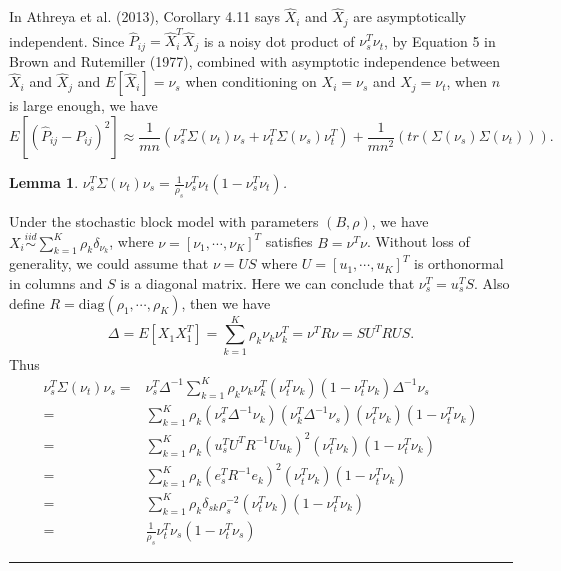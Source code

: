 \documentclass[a4paper]{article}
\newenvironment{proof}{{\bf Proof:  }}{\hfill\rule{2mm}{2mm}}
\newtheorem{lemma}[fact]{Lemma}
\begin{document}
In Athreya et al. (2013), Corollary 4.11 says $\hat{X}_i$ and $\hat{X}_j$ are asymptotically independent. Since $\hat{P}_{ij} = \hat{X}_i^T \hat{X}_j$ is a noisy dot product of $\nu_s^T \nu_t$, by Equation 5 in Brown and Rutemiller (1977), combined with asymptotic independence between $\hat{X}_i$ and $\hat{X}_j$ and $E[\hat{X}_i] = \nu_s$ when conditioning on $X_i = \nu_s$ and $X_j = \nu_t$, when $n$ is large enough, we have
\begin{equation}
\label{eqn:1}
	E[(\hat{P}_{ij} - P_{ij})^2] \approx
    \frac{1}{m n} \left( \nu_s^T \Sigma(\nu_t) \nu_s + \nu_t^T \Sigma(\nu_s) \nu_t^T \right)
    + \frac{1}{m n^2} \left( tr(\Sigma(\nu_s) \Sigma(\nu_t)) \right).
\end{equation}


\begin{lemma}
\label{lemma:1}
$\nu_s^T \Sigma(\nu_t) \nu_s = \frac{1}{\rho_s} \nu_s^T \nu_t (1- \nu_s^T \nu_t)$.
\end{lemma}
\begin{proof}
Under the stochastic block model with parameters $(B, \rho)$, we have $X_i \stackrel{iid}{\sim} \sum_{k=1}^K \rho_k \delta_{\nu_k}$, where $\nu = [\nu_1, \cdots, \nu_K]^T$ satisfies $B = \nu^T \nu$. Without loss of generality, we could assume that $\nu = U S$ where $U = [u_1, \cdots, u_K]^T$ is orthonormal in columns and $S$ is a diagonal matrix. Here we can conclude that $\nu_s^T = u_s^T S$. Also define $R = \text{diag}(\rho_1, \cdots, \rho_K)$, then we have
\[
	\Delta = E[X_1 X_1^T] = \sum_{k=1}^K \rho_k \nu_k \nu_k^T = \nu^T R \nu = S U^T R U S.
\]
Thus
\begin{align*}
	\nu_s^T \Sigma(\nu_t) \nu_s = &
    \nu_s^T \Delta^{-1} \sum_{k=1}^K \rho_k \nu_k \nu_k^T (\nu_t^T \nu_k)(1 - \nu_t^T \nu_k) \Delta^{-1} \nu_s \\
    = & \sum_{k=1}^K \rho_k (\nu_s^T \Delta^{-1} \nu_k) (\nu_k^T \Delta^{-1} \nu_s) (\nu_t^T \nu_k) (1 - \nu_t^T \nu_k) \\
    = & \sum_{k=1}^K \rho_k (u_s^T U^T R^{-1} U u_k)^2 (\nu_t^T \nu_k) (1 - \nu_t^T \nu_k) \\
    = & \sum_{k=1}^K \rho_k (e_s^T R^{-1} e_k)^2 (\nu_t^T \nu_k) (1 - \nu_t^T \nu_k) \\
    = & \sum_{k=1}^K \rho_k \delta_{sk} \rho_s^{-2} (\nu_t^T \nu_k) (1 - \nu_t^T \nu_k) \\
    = & \frac{1}{\rho_s} \nu_t^T \nu_s (1 - \nu_t^T \nu_s)
\end{align*}
\end{proof}
\end{document}
